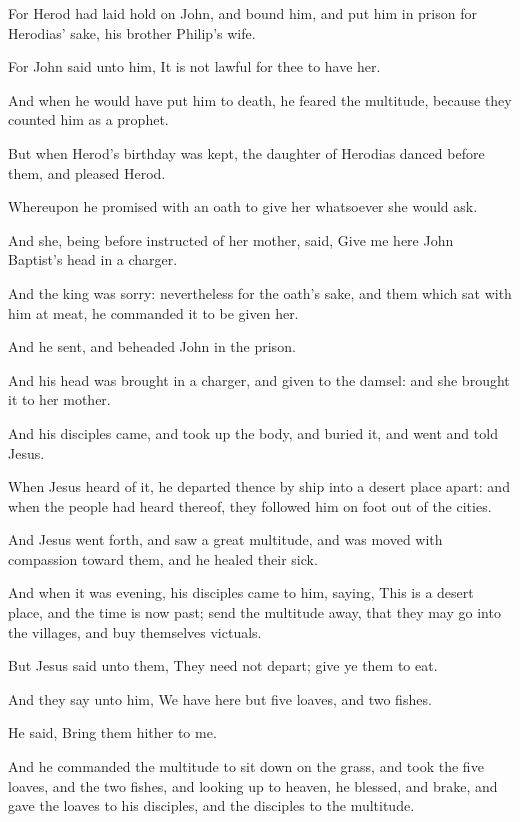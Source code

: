 \verse For Herod had laid hold on John, and bound him, and put him in prison for Herodias' sake, his brother Philip's wife.

\verse For John said unto him, It is not lawful for thee to have her.

\verse And when he would have put him to death, he feared the multitude, because they counted him as a prophet.

\verse But when Herod's birthday was kept, the daughter of Herodias danced before them, and pleased Herod.

\verse Whereupon he promised with an oath to give her whatsoever she would ask.

\verse And she, being before instructed of her mother, said, Give me here John Baptist's head in a charger.

\verse And the king was sorry: nevertheless for the oath's sake, and them which sat with him at meat, he commanded it to be given her.

\verse And he sent, and beheaded John in the prison.

\verse And his head was brought in a charger, and given to the damsel: and she brought it to her mother.

\verse And his disciples came, and took up the body, and buried it, and went and told Jesus.

\verse When Jesus heard of it, he departed thence by ship into a desert place apart: and when the people had heard thereof, they followed him on foot out of the cities.

\verse And Jesus went forth, and saw a great multitude, and was moved with compassion toward them, and he healed their sick.

\verse And when it was evening, his disciples came to him, saying, This is a desert place, and the time is now past; send the multitude away, that they may go into the villages, and buy themselves victuals.

\verse But Jesus said unto them, They need not depart; give ye them to eat.

\verse And they say unto him, We have here but five loaves, and two fishes.

\verse He said, Bring them hither to me.

\verse And he commanded the multitude to sit down on the grass, and took the five loaves, and the two fishes, and looking up to heaven, he blessed, and brake, and gave the loaves to his disciples, and the disciples to the multitude.

